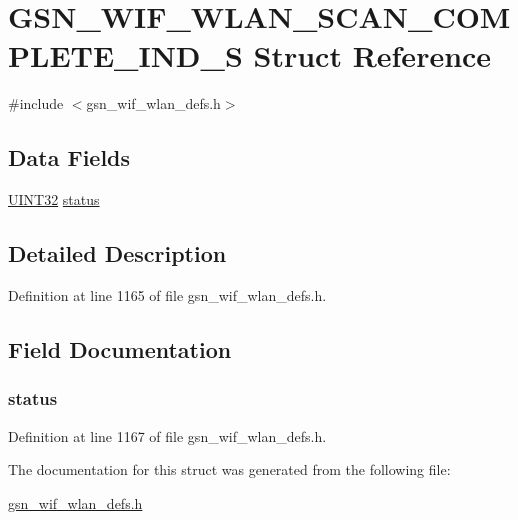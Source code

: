 \hypertarget{a00399}{
\section{GSN\_\-WIF\_\-WLAN\_\-SCAN\_\-COMPLETE\_\-IND\_\-S Struct Reference}
\label{a00399}
}


{\ttfamily \#include $<$gsn\_\-wif\_\-wlan\_\-defs.h$>$}

\subsection*{Data Fields}
\begin{DoxyCompactItemize}
\item 
\hyperlink{a00660_gae1e6edbbc26d6fbc71a90190d0266018}{UINT32} \hyperlink{a00399_ac6b7193d1fe7063cf448ef96398230d8}{status}
\end{DoxyCompactItemize}


\subsection{Detailed Description}


Definition at line 1165 of file gsn\_\-wif\_\-wlan\_\-defs.h.



\subsection{Field Documentation}
\hypertarget{a00399_ac6b7193d1fe7063cf448ef96398230d8}{
\subsubsection[{status}]{ {\bf status}}}
\label{a00399_ac6b7193d1fe7063cf448ef96398230d8}


Definition at line 1167 of file gsn\_\-wif\_\-wlan\_\-defs.h.



The documentation for this struct was generated from the following file:\begin{DoxyCompactItemize}
\item 
\hyperlink{a00613}{gsn\_\-wif\_\-wlan\_\-defs.h}\end{DoxyCompactItemize}
